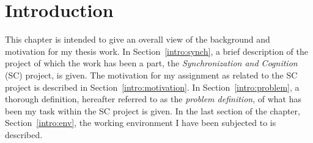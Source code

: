 
\cleardoublepage
\chapter{Introduction}
\label{intro}

This chapter is intended to give an overall view of the background
and motivation for my thesis work.  In Section~\ref{intro:synch}, a
brief description of the project of which the work has been a part,
the {\em Synchronization and Cognition\/} (SC) project, is given.  The
motivation for my assignment as related to the SC project is described
in Section~\ref{intro:motivation}.  In Section~\ref{intro:problem}, a
thorough definition, hereafter referred to as the {\em problem
  definition\/}, of what has been my task within the SC project is
given.  In the last section of the chapter, Section~\ref{intro:env},
the working environment I have been subjected to is described.





